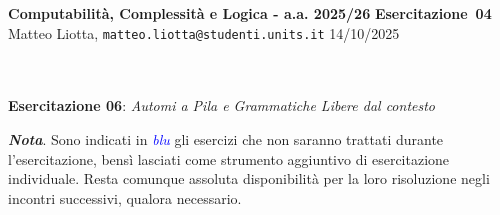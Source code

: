\documentclass[a4paper,10pt]{article}
\makeatletter
\newcommand{\EsercitazioneNum}{04}
\newcommand{\Data}{14/10/2025}
\newcommand{\DocType}{Esercitazione} %
\newcommand{\FullTitle}{\DocType\ \EsercitazioneNum}
\newcommand{\Header}{
\noindent
  \small \textbf{Computabilità, Complessità e Logica - a.a. 2025/26} \hfill \textbf{\FullTitle} \\[0.2cm]
  \scriptsize Matteo Liotta, \texttt{matteo.liotta@studenti.units.it} \hfill \Data \\[0.2cm]
  \noindent\makebox[\linewidth]{\rule{\linewidth}{0.4pt}} \\[0.3cm]}
\makeatother
\begin{document}
\footnotesize  %
\Header\\[0.7cm]



\noindent\Large \textbf{Esercitazione 06}: \textit{Automi a Pila e Grammatiche Libere dal contesto}
\begin{osservazioni}
    \textbf{\textit{Nota}}. Sono indicati in \textcolor{blue}{\textit{blu}} gli esercizi che non saranno trattati durante l'esercitazione, bensì lasciati come strumento aggiuntivo di esercitazione individuale. Resta comunque assoluta disponibilità per la loro risoluzione negli incontri successivi, qualora necessario.
\end{osservazioni}
\end{document}
